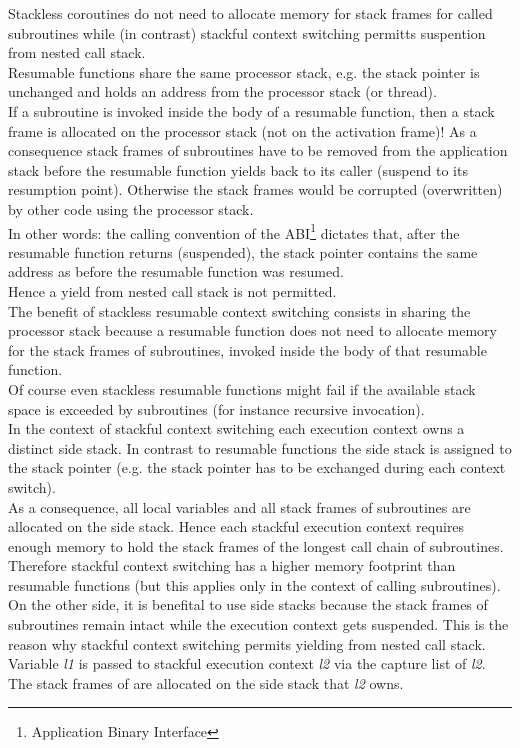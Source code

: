Stackless coroutines do not need to allocate memory for stack frames for called
subroutines while (in contrast) stackful context switching permitts suspention
from nested call stack.\\
\newline
Resumable functions share the same processor stack, e.g. the stack pointer is
unchanged and holds an address from the processor stack (\main or thread).\\
If a subroutine is invoked inside the body of a resumable function, then a stack
frame is allocated on the processor stack (not on the activation frame)! As a
consequence stack frames of subroutines have to be removed from the application
stack before the resumable function yields back to its caller (suspend to its
resumption point). Otherwise the stack frames would be corrupted (overwritten)
by other code using the processor stack.\\
In other words: the calling convention of the ABI\footnote{Application Binary
Interface} dictates that, after the resumable function returns (suspended), the
stack pointer contains the same address as before the resumable function was
resumed.\\
Hence a yield from nested call stack is not permitted.\\
The benefit of stackless resumable context switching consists in sharing the
processor stack because a resumable function does not need to allocate memory
for the stack frames of subroutines, invoked inside the body of that resumable
function.\\
\newline
Of course even stackless resumable functions might fail if the available stack
space is exceeded by subroutines (for instance recursive invocation).\\
\newline
In the context of stackful context switching each execution context owns a
distinct side stack. In contrast to resumable functions the side stack is
assigned to the stack pointer (e.g. the stack pointer has to be exchanged during
each context switch).\\
As a consequence, all local variables and all stack frames of subroutines are
allocated on the side stack. Hence each stackful execution context requires
enough memory to hold the stack frames of the longest call chain of subroutines.
Therefore stackful context switching has a higher memory footprint than
resumable functions (but this applies only in the context of calling
subroutines).\\
On the other side, it is benefital to use side stacks because the stack frames
of subroutines remain intact while the execution context gets suspended. This is
the reason why stackful context switching permits yielding from nested call
stack.
Variable \emph{l1} is passed to stackful execution context \emph{l2} via
the capture list of \emph{l2}. The stack frames of  are
allocated on the side stack that \emph{l2} owns.

